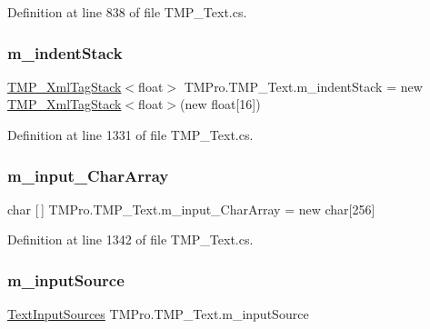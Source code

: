 Definition at line 838 of file T\+M\+P\+\_\+\+Text.\+cs.

\mbox{\label{class_t_m_pro_1_1_t_m_p___text_a95340e7f060b7ae93364e4343d5045ca}} 
\subsubsection{\texorpdfstring{m\_indentStack}{m\_indentStack}}
{\footnotesize\ttfamily \mbox{\hyperlink{struct_t_m_pro_1_1_t_m_p___xml_tag_stack}{T\+M\+P\+\_\+\+Xml\+Tag\+Stack}}$<$float$>$ T\+M\+Pro.\+T\+M\+P\+\_\+\+Text.\+m\+\_\+indent\+Stack = new \mbox{\hyperlink{struct_t_m_pro_1_1_t_m_p___xml_tag_stack}{T\+M\+P\+\_\+\+Xml\+Tag\+Stack}}$<$float$>$(new float\mbox{[}16\mbox{]})\hspace{0.3cm}{\ttfamily [protected]}}



Definition at line 1331 of file T\+M\+P\+\_\+\+Text.\+cs.

\mbox{\label{class_t_m_pro_1_1_t_m_p___text_aecaccf0af62aa38ef66a15a3eaff1e8a}} 
\subsubsection{\texorpdfstring{m\_input\_CharArray}{m\_input\_CharArray}}
{\footnotesize\ttfamily char \mbox{[}$\,$\mbox{]} T\+M\+Pro.\+T\+M\+P\+\_\+\+Text.\+m\+\_\+input\+\_\+\+Char\+Array = new char\mbox{[}256\mbox{]}\hspace{0.3cm}{\ttfamily [protected]}}



Definition at line 1342 of file T\+M\+P\+\_\+\+Text.\+cs.

\mbox{\label{class_t_m_pro_1_1_t_m_p___text_afb489cf0fbdef30ad456edfd5be8c71e}} 
\subsubsection{\texorpdfstring{m\_inputSource}{m\_inputSource}}
{\footnotesize\ttfamily \mbox{\hyperlink{class_t_m_pro_1_1_t_m_p___text_ad5e8f5f99ee7ce332ad3531b8ba0096d}{Text\+Input\+Sources}} T\+M\+Pro.\+T\+M\+P\+\_\+\+Text.\+m\+\_\+input\+Source\hspace{0.3cm}{\ttfamily [protected]}}



